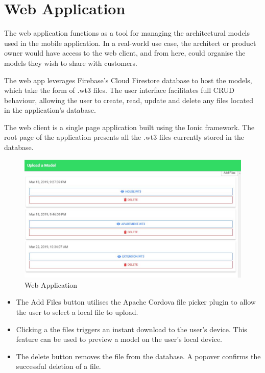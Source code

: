 \section{Web Application}
The web application functions as a tool for managing the architectural models used in the mobile application. In a real-world use case, the architect or product owner would have access to the web client, and from here, could organise the models they wish to share with customers. 

The web app leverages Firebase’s Cloud Firestore database to host the models, which take the form of .wt3 files. The user interface facilitates full CRUD behaviour, allowing the user to create, read, update and delete any files located in the application’s database.

The web client is a single page application built using the Ionic framework. The root page of the application presents all the .wt3 files currently stored in the database.

\begin{figure}[ht!]
\caption{Web Application}
\centering
\includegraphics[width=1\textwidth]{images/web_client.JPG}
\end{figure}


\begin{itemize}
    \item The Add Files button utilises the Apache Cordova file picker plugin to allow the user to select a local file to upload.
    
    \item Clicking a the files triggers an instant download to the user’s device. This feature can be used to preview a model on the user’s local device. 

    \item The delete button removes the file from the database. A popover confirms the successful deletion of a file. \\ \\
\end{itemize}



